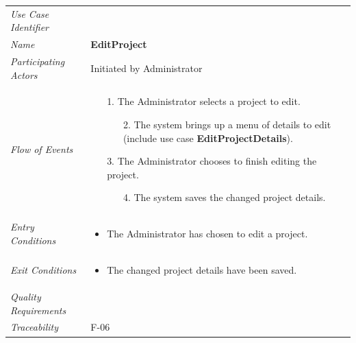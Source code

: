 \documentclass[12pt,letterpaper]{article}
\begin{document}
\begin{center}
	\begin{tabu} to 
		\toprule
		Use Case Identifier & \editproject{} \\
		Name & {\bf EditProject} \\
		Participating Actors & Initiated by Administrator \\
		Flow of Events & 
	    \begin{enumerate}[topsep=-1em,leftmargin=*]
		    \item[1.] The Administrator selects a project to edit.
		    \begin{enumerate}
		        \item[2.] The system brings up a menu of details to edit (include use case \textbf{EditProjectDetails}).
		    \end{enumerate}
		    \item[3.] The Administrator chooses to finish editing the project.
		    \begin{enumerate}
		        \item[4.] The system saves the changed project details.
		    \end{enumerate}
		\end{enumerate} \\

		Entry Conditions &
		\begin{itemize}[topsep=-1em,leftmargin=*]
		    \item The Administrator has chosen to edit a project.
        \end{itemize} \\

		Exit Conditions &
		\begin{itemize}[topsep=-1em,leftmargin=*]
		    \item The changed project details have been saved.
        \end{itemize} \\

		Quality Requirements & \\

		Traceability & F-06 \\
		\toprule
	\end{tabu}
\end{center}
\end{document}
